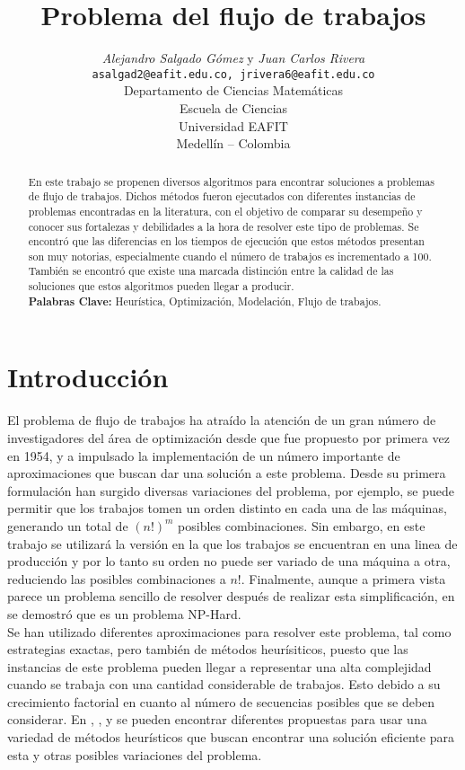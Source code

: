 \documentclass[10pt, twoside]{article}
\title{Problema del flujo de trabajos}
\author{\emph{Alejandro Salgado Gómez} y \emph{Juan Carlos Rivera}\\
\vspace{0.3cm}
\small{\tt{asalgad2@eafit.edu.co, jrivera6@eafit.edu.co}}\\
Departamento de Ciencias Matemáticas\\
Escuela de Ciencias\\
Universidad EAFIT\\
Medellín -- Colombia}
\date{}
\begin{document}
    \maketitle

    \thispagestyle{firststyle}

\begin{abstract}
En este trabajo se propenen diversos algoritmos para encontrar
soluciones a problemas de flujo de trabajos. Dichos métodos fueron ejecutados 
con diferentes instancias de problemas encontradas en la literatura, con el
objetivo de comparar su desempeño y conocer sus fortalezas y debilidades a
la hora de resolver este tipo de problemas. Se encontró que las diferencias en
los tiempos de ejecución que estos métodos presentan son muy notorias,
especialmente cuando el número de trabajos es incrementado a 100. También
se encontró que existe una marcada distinción entre la calidad de las
soluciones que estos algoritmos pueden llegar a producir.\\

\noindent \textbf{Palabras Clave:}
Heurística, Optimización, Modelación, Flujo de trabajos.
\end{abstract}

\section{Introducción}

El problema de flujo de trabajos ha atraído la atención de un gran número de
investigadores del área de optimización desde que fue propuesto por primera vez
en 1954, y a impulsado la implementación de un número importante de
aproximaciones que buscan dar una solución a este problema. Desde su primera
formulación han surgido diversas variaciones del problema, por ejemplo, se puede 
permitir que los trabajos tomen un orden distinto en cada una de las máquinas,
generando un total de $(n!)^m$ posibles combinaciones. Sin embargo, en este
trabajo se utilizará la versión en la que los trabajos se encuentran en una linea
de producción y por lo tanto su orden no puede ser variado de una máquina a otra,
reduciendo las posibles combinaciones a $n!$. Finalmente, aunque a primera
vista parece un problema sencillo de resolver después de realizar esta
simplificación, en \cite{complex} se demostró que es un problema
NP-Hard.\\

Se han utilizado diferentes aproximaciones para resolver este problema, tal como
estrategias exactas, pero también de métodos heurísiticos, puesto que las 
instancias de este problema pueden llegar a representar una alta complejidad
cuando se trabaja con una cantidad considerable de trabajos. Esto debido a su
crecimiento factorial en cuanto al número de secuencias posibles que se deben
considerar. En \cite{heuristico4}, \cite{heuristico1}, \cite{heuristico2} y
\cite{heuristico3} se pueden encontrar diferentes propuestas para usar una
variedad de métodos heurísticos que buscan encontrar una solución eficiente
para esta y otras posibles variaciones del problema.\\
\end{document}

